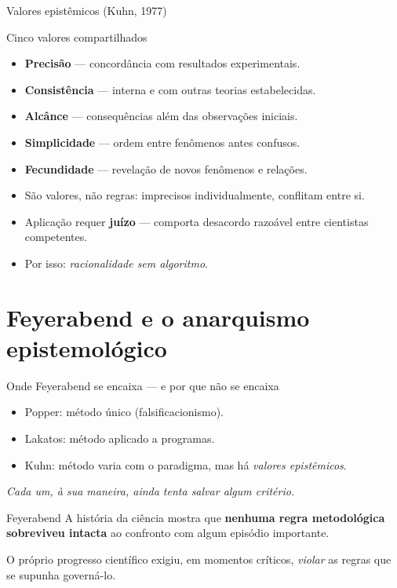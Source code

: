 \documentclass[aspectratio=169]{beamer}
\newcommand{\impt}[1]{\textcolor{maccent}{\textbf{#1}}}
\newcommand{\ntc}[1]{\textcolor{mprimary}{#1}}
\begin{document}
\begin{frame}{Valores epist\^emicos (Kuhn, 1977)}
\begin{block}{Cinco valores compartilhados}
\begin{itemize}
    \item \impt{Precis\~ao} --- concord\^ancia com resultados experimentais.
    \item \impt{Consist\^encia} --- interna e com outras teorias estabelecidas.
    \item \impt{Alc\^ance} --- consequ\^encias al\'em das observa\c c\~oes iniciais.
    \item \impt{Simplicidade} --- ordem entre fen\^omenos antes confusos.
    \item \impt{Fecundidade} --- revela\c c\~ao de novos fen\^omenos e rela\c c\~oes.
\end{itemize}
\end{block}
\vspace{0.3cm}
\begin{itemize}
    \item S\~ao \ntc{valores}, n\~ao regras: imprecisos individualmente, conflitam entre si.
    \item Aplica\c c\~ao requer \impt{ju\'izo} --- comporta desacordo razo\'avel entre cientistas competentes.
    \item Por isso: \emph{racionalidade sem algoritmo}.
\end{itemize}
\end{frame}

\section{Feyerabend e o anarquismo epistemol\'ogico}

\begin{frame}{Onde Feyerabend se encaixa --- e por que n\~ao se encaixa}
\begin{itemize}
    \item Popper: m\'etodo \'unico (falsificacionismo).
    \item Lakatos: m\'etodo aplicado a programas.
    \item Kuhn: m\'etodo varia com o paradigma, mas h\'a \emph{valores epist\^emicos}.
\end{itemize}
\vspace{0.4cm}
\begin{center}
\itshape Cada um, \`a sua maneira, ainda tenta salvar \emph{algum} crit\'erio.
\end{center}
\vspace{0.4cm}
\begin{alertblock}{Feyerabend}
A hist\'oria da ci\^encia mostra que \impt{nenhuma regra metodol\'ogica sobreviveu intacta} ao confronto com algum epis\'odio importante.

\vspace{0.15cm}
O pr\'oprio progresso cient\'ifico exigiu, em momentos cr\'iticos, \emph{violar} as regras que se supunha govern\'a-lo.
\end{alertblock}
\end{frame}
\end{document}
